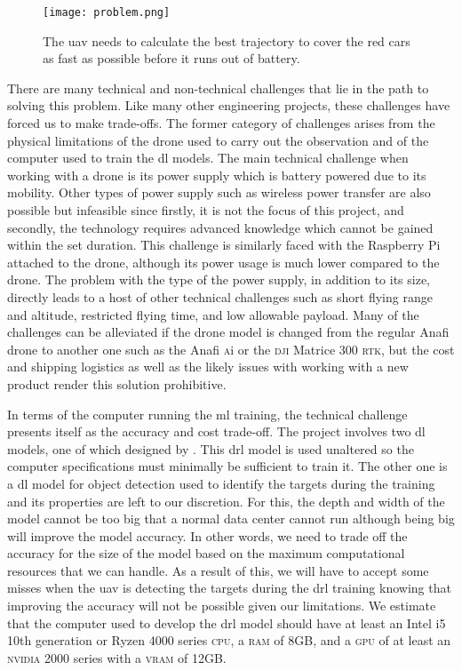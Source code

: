 \documentclass[../main.tex]{subfiles}
\begin{document}
\begin{figure}[tb] 
    \centering
    \texttt{[image: problem.png]} 
    \caption{The \gls{uav} needs to calculate 
    the best trajectory to cover the red cars
    as fast as possible before it runs out of battery.} 
    \label{fig:problem} 
\end{figure}

There are many technical and non-technical challenges
that lie in the path to solving this problem.
Like many other engineering projects,
these challenges have forced us to make trade-offs.
The former category of challenges arises 
from the physical limitations of the drone used to
carry out the observation
and of the computer used to train the \gls{dl} models.
The main technical challenge when working with a drone
is its power supply which is battery powered due to its mobility. 
Other types of power supply such as wireless power transfer
are also possible but infeasible since firstly, it is not the
focus of this project, and secondly, the technology requires 
advanced knowledge which cannot be gained within the set duration.
This challenge is similarly faced with the Raspberry Pi attached
to the drone, although its power usage 
is much lower compared to the drone.
The problem with the type of the power supply, in addition to its size, 
directly leads to a host of other technical challenges
such as short flying range and altitude, restricted flying time,
and low allowable payload.
Many of the challenges can be alleviated if the drone model is changed
from the regular Anafi drone to another one such as 
the Anafi \textsc{a}i or the \textsc{dji} Matrice 300 \textsc{rtk},
but the cost and shipping logistics as well as
the likely issues with working with a new product
render this solution prohibitive.

In terms of the computer running the \gls{ml} training,
the technical challenge presents itself as 
the accuracy and cost trade-off.
The project involves two \gls{dl} models,
one of which designed by \textcite{Ged21}.
This \gls{drl} model is used unaltered so 
the computer specifications must minimally be sufficient 
to train it.
The other one is a \gls{dl} model for object detection
used to identify the targets during the training
and its properties are left to our discretion.
For this, 
the depth and width of the model cannot be too big that
a normal data center cannot run although 
being big will improve
the model accuracy. In other words, we need to trade off
the accuracy for the size of the model 
based on the maximum computational resources that we can handle. 
As a result of this, we will have to accept some misses
when the \gls{uav} is detecting the targets during the 
\gls{drl} training knowing that improving the accuracy 
will not be possible given our limitations.
We estimate that the computer used to develop the \gls{drl} model
should have at least an Intel i5 10th generation or
Ryzen 4000 series \textsc{cpu}, a \textsc{ram} of 8GB, 
and a \textsc{gpu} of at least an \textsc{nvidia} 2000 series
with a \textsc{vram} of 12GB.
\end{document}

